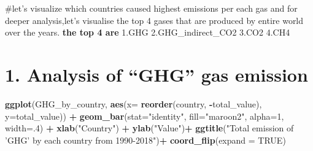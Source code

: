 \documentclass[
]{article}
\newenvironment{Shaded}{\begin{snugshade}}{\end{snugshade}}
\newcommand{\CommentTok}[1]{\textcolor[rgb]{0.56,0.35,0.01}{\textit{#1}}}
\newcommand{\DataTypeTok}[1]{\textcolor[rgb]{0.13,0.29,0.53}{#1}}
\newcommand{\DecValTok}[1]{\textcolor[rgb]{0.00,0.00,0.81}{#1}}
\newcommand{\KeywordTok}[1]{\textcolor[rgb]{0.13,0.29,0.53}{\textbf{#1}}}
\newcommand{\NormalTok}[1]{#1}
\newcommand{\OperatorTok}[1]{\textcolor[rgb]{0.81,0.36,0.00}{\textbf{#1}}}
\newcommand{\OtherTok}[1]{\textcolor[rgb]{0.56,0.35,0.01}{#1}}
\newcommand{\StringTok}[1]{\textcolor[rgb]{0.31,0.60,0.02}{#1}}
\begin{document}
\#let's visualize which countries caused highest emissions per each gas
and for deeper analysis,let's visualise the top 4 gases that are
produced by entire world over the years. \textbf{the top 4 are} 1.GHG
2.GHG\_indirect\_CO2 3.CO2 4.CH4

\hypertarget{analysis-of-ghg-gas-emission}{%
\section{1. Analysis of ``GHG'' gas
emission}\label{analysis-of-ghg-gas-emission}}

\begin{Shaded}
\end{Shaded}

\begin{Shaded}
\begin{Highlighting}[]
\KeywordTok{ggplot}\NormalTok{(GHG_by_country, }\KeywordTok{aes}\NormalTok{(}\DataTypeTok{x=} \KeywordTok{reorder}\NormalTok{(country, }\OperatorTok{-}\NormalTok{total_value), }\DataTypeTok{y=}\NormalTok{total_value)) }\OperatorTok{+}
\StringTok{    }\KeywordTok{geom_bar}\NormalTok{(}\DataTypeTok{stat=}\StringTok{"identity"}\NormalTok{, }\DataTypeTok{fill=}\StringTok{"maroon2"}\NormalTok{, }\DataTypeTok{alpha=}\DecValTok{1}\NormalTok{, }\DataTypeTok{width=}\NormalTok{.}\DecValTok{4}\NormalTok{) }\OperatorTok{+}
\StringTok{    }\KeywordTok{xlab}\NormalTok{(}\StringTok{"Country"}\NormalTok{) }\OperatorTok{+}
\StringTok{    }\KeywordTok{ylab}\NormalTok{(}\StringTok{"Value"}\NormalTok{)}\OperatorTok{+}
\StringTok{    }\KeywordTok{ggtitle}\NormalTok{(}\StringTok{"Total emission of 'GHG' by each country from 1990-2018"}\NormalTok{)}\OperatorTok{+}
\StringTok{  }\KeywordTok{coord_flip}\NormalTok{(}\DataTypeTok{expand =} \OtherTok{TRUE}\NormalTok{)}
\end{Highlighting}
\end{Shaded}
\end{document}
